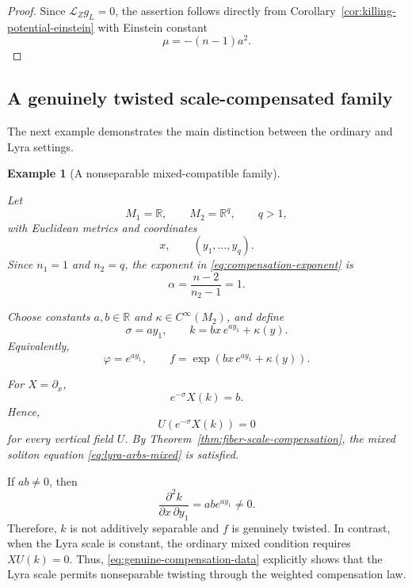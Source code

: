 \documentclass[a4paper,11pt]{article}
\theoremstyle{plain}
\newtheorem{example}{Example}[section]
\numberwithin{equation}{section}
\begin{document}
\begin{proof}
	Since \(\mathcal L_{Z}g_{L}=0\), the assertion follows directly
	from Corollary~\ref{cor:killing-potential-einstein} with
	Einstein constant
	\[
	\mu=-(n-1)a^{2}.
	\]
\end{proof}

\subsection{A genuinely twisted scale-compensated family}
\label{subsec:genuine-scale-compensation}

The next example demonstrates the main distinction between the
ordinary and Lyra settings.

\begin{example}[A nonseparable mixed-compatible family]
	\label{ex:genuine-scale-compensation}
	
	Let
	\[
	M_{1}=\mathbb R,
	\qquad
	M_{2}=\mathbb R^{q},
	\qquad
	q>1,
	\]
	with Euclidean metrics and coordinates
	\[
	x,
	\qquad
	(y_{1},\ldots,y_{q}).
	\]
	Since \(n_{1}=1\) and \(n_{2}=q\), the exponent in
	\eqref{eq:compensation-exponent} is
	\[
	\alpha
	=
	\frac{n-2}{n_{2}-1}
	=
	1.
	\]
	
	Choose constants \(a,b\in\mathbb R\) and
	\(\kappa\in C^{\infty}(M_{2})\), and define
	\begin{equation}
		\sigma=ay_{1},
		\qquad
		k
		=
		bx\,e^{ay_{1}}
		+
		\kappa(y).
		\label{eq:genuine-compensation-data}
	\end{equation}
	Equivalently,
	\begin{equation}
		\varphi=e^{ay_{1}},
		\qquad
		f
		=
		\exp
		\left(
		bx\,e^{ay_{1}}+\kappa(y)
		\right).
		\label{eq:genuine-compensation-functions}
	\end{equation}
	
	For \(X=\partial_{x}\),
	\begin{equation}
		e^{-\sigma}X(k)
		=
		b.
		\label{eq:genuine-compensation-identity}
	\end{equation}
	Hence,
	\[
	U\!\left(
	e^{-\sigma}X(k)
	\right)=0
	\]
	for every vertical field \(U\). By
	Theorem~\ref{thm:fiber-scale-compensation}, the mixed soliton
	equation \eqref{eq:lyra-arbs-mixed} is satisfied.
\end{example}

If \(ab\neq0\), then
\begin{equation}
	\frac{\partial^{2}k}
	{\partial x\,\partial y_{1}}
	=
	ab e^{ay_{1}}
	\neq0.
	\label{eq:genuine-compensation-nonseparable}
\end{equation}
Therefore, \(k\) is not additively separable and \(f\) is genuinely
twisted. In contrast, when the Lyra scale is constant, the ordinary
mixed condition requires \(XU(k)=0\). Thus,
\eqref{eq:genuine-compensation-data} explicitly shows that the Lyra
scale permits nonseparable twisting through the weighted
compensation law.
\end{document}
